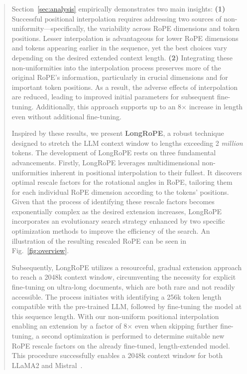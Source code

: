 \begin{abstract}
Section~\ref{sec:analysis} empirically demonstrates two main insights: \textbf{(1)} Successful positional interpolation requires addressing two sources of non-uniformity—specifically, the variability across RoPE dimensions and token positions. Lesser interpolation is advantageous for lower RoPE dimensions and tokens appearing earlier in the sequence, yet the best choices vary depending on the desired extended context length. 
\textbf{(2)} Integrating these non-uniformities into the interpolation process preserves more of the original RoPE’s information, particularly in crucial dimensions and for important token positions. As a result, the adverse effects of interpolation are reduced, leading to improved initial parameters for subsequent fine-tuning. Additionally, this approach supports up to an 8$\times$ increase in length even without additional fine-tuning.

Inspired by these results, we present \textbf{LongRoPE}, a robust technique designed to stretch the LLM context window to lengths exceeding 2 \emph{million} tokens. The development of LongRoPE rests on three fundamental advancements. Firstly, {LongRoPE} leverages multidimensional non-uniformities inherent in positional interpolation to their fullest. It discovers optimal rescale factors for the rotational angles in RoPE, tailoring them for each individual RoPE dimension according to the tokens’ positions. Given that the process of identifying these rescale factors becomes exponentially complex as the desired extension increases, {LongRoPE} incorporates an evolutionary search strategy enhanced by two specific optimization methods to improve the efficiency of the search. An illustration of the resulting rescaled RoPE can be seen in Fig.~\ref{fig:overview}.

Subsequently, {LongRoPE} utilizes a resourceful, gradual extension approach to reach a 2048k context window, circumventing the necessity for explicit fine-tuning on ultra-long documents, which are both rare and not readily accessible. The process initiates with identifying a 256k token length compatible with the pre-trained LLM, followed by fine-tuning the model at this sequence length. With our non-uniform positional interpolation enabling an extension by a factor of 8$\times$ even when skipping further fine-tuning, a second optimization is performed to determine suitable new RoPE rescale factors on the already fine-tuned, length-extended model. This procedure successfully enables a 2048k context window for both LLaMA2 and Mistral~\cite{mistral}.


\end{abstract}
